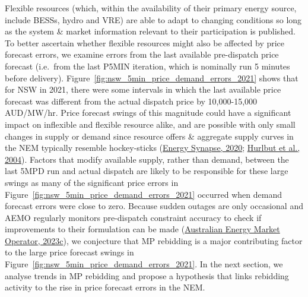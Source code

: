 \documentclass[12pt,a4paper,]{report}
\begin{document}
Flexible resources (which, within the availability of their primary
energy source, include BESSs, hydro and VRE) are able to adapt to
changing conditions so long as the system \& market information relevant
to their participation is published. To better ascertain whether
flexible resources might also be affected by price forecast errors, we
examine errors from the last available pre-dispatch price forecast
(i.e.~from the last P5MIN iteration, which is nominally run 5 minutes
before delivery). Figure~\ref{fig:nsw_5min_price_demand_errors_2021}
shows that for NSW in 2021, there were some intervals in which the last
available price forecast was different from the actual dispatch price by
10,000-15,000 AUD/MW/hr. Price forecast swings of this magnitude could
have a significant impact on inflexible and flexible resource alike, and
are possible with only small changes in supply or demand since resource
offers \& aggregate supply curves in the NEM typically resemble
hockey-sticks
(\protect\hyperlink{ref-energysynapseDemandResponseNational2020}{Energy
Synapse, 2020};
\protect\hyperlink{ref-hurlbutProtectingMarketHockey2004}{Hurlbut et
al., 2004}). Factors that modify available supply, rather than demand,
between the last 5MPD run and actual dispatch are likely to be
responsible for these large swings as many of the significant price
errors in Figure~\ref{fig:nsw_5min_price_demand_errors_2021} occurred
when demand forecast errors were close to zero. Because sudden outages
are only occasional and AEMO regularly monitors pre-dispatch constraint
accuracy to check if improvements to their formulation can be made
(\protect\hyperlink{ref-australianenergymarketoperatorMonthlyConstraintReport2023}{Australian
Energy Market Operator, 2023c}), we conjecture that MP rebidding is a
major contributing factor to the large price forecast swings in
Figure~\ref{fig:nsw_5min_price_demand_errors_2021}. In the next section,
we analyse trends in MP rebidding and propose a hypothesis that links
rebidding activity to the rise in price forecast errors in the NEM.
\end{document}
